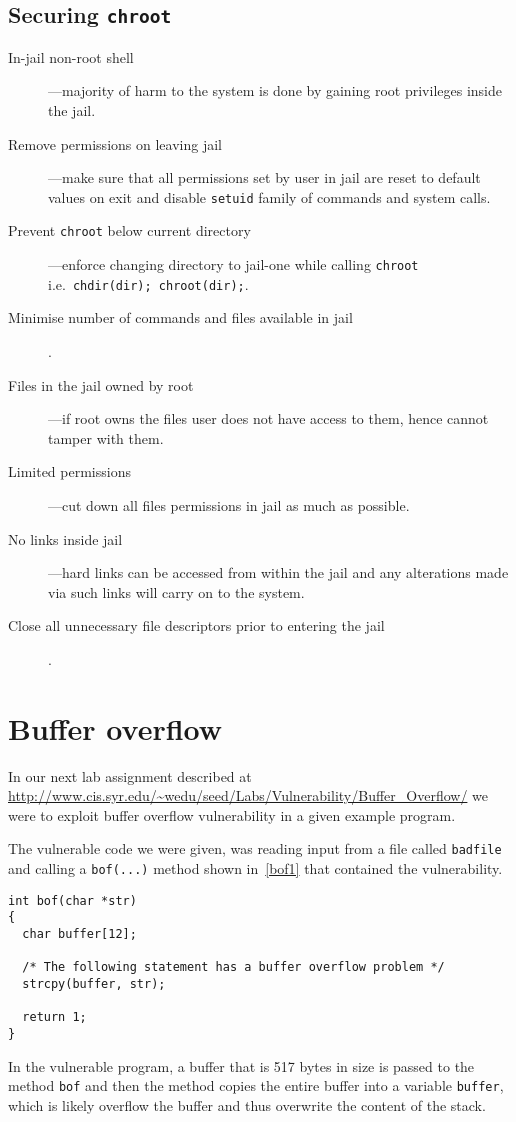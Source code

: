 \documentclass[12pt, a4paper, pdflatex]{article}
\begin{document}
\subsection{Securing \texttt{chroot}}
\begin{description}
  \item[In-jail non-root shell]---majority of harm to the system is done by gaining root privileges inside the jail.
  \item[Remove permissions on leaving jail]---make sure that all permissions set by user in jail are reset to default values on exit and disable \texttt{setuid} family of commands and system calls.
  \item[Prevent \texttt{chroot} below current directory]---enforce changing directory to jail-one while calling \texttt{chroot} i.e.\ \texttt{chdir(dir); chroot(dir);}.
  \item[Minimise number of commands and files available in jail].
  \item[Files in the jail owned by root]---if root owns the files user does not have access to them, hence cannot tamper with them.
  \item[Limited permissions]---cut down all files permissions in jail as much as possible.
  \item[No links inside jail]---hard links can be accessed from within the jail and any alterations made via such links will carry on to the system.
  \item[Close all unnecessary file descriptors prior to entering the jail].
\end{description}

\section{Buffer overflow\label{sec:buffover}}

In our next lab assignment described at \url{http://www.cis.syr.edu/~wedu/seed/Labs/Vulnerability/Buffer_Overflow/} we were to exploit buffer overflow vulnerability in a given example program.

The vulnerable code we were given, was reading input from a file called \texttt{badfile} and calling a \texttt{bof(...)} method shown in~\ref{bof1} that contained the vulnerability.

\vspace{1em}
\lstset{
	captionpos=b,
	frame=single,
	language=C,
	breaklines=true,
	caption=Function with buffer overflow vulnerability,
	label=bof1,
  float=tb
}
\begin{lstlisting}
int bof(char *str)
{
  char buffer[12];

  /* The following statement has a buffer overflow problem */ 
  strcpy(buffer, str);

  return 1;
}
\end{lstlisting}
In the vulnerable program, a buffer that is 517 bytes in size is passed to the method \texttt{bof} and then the method copies the entire buffer into a variable \texttt{buffer}, which is likely overflow the buffer and thus overwrite the content of the stack.
\end{document}
